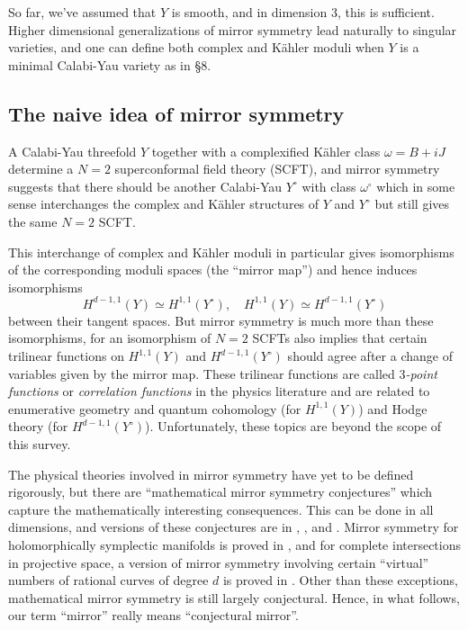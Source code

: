 \documentclass{amsart}
\theoremstyle{plain}
\theoremstyle{definition}
\begin{document}
	So far, we've assumed that $Y$ is smooth, and in dimension 3,
this is sufficient.  Higher dimensional generalizations of mirror
symmetry lead naturally to singular varieties, and one can define both
complex and K\"ahler moduli when $Y$ is a minimal Calabi-Yau variety
as in \S8.

	\subsection{The naive idea of mirror symmetry} A
Calabi-Yau threefold $Y$ together with a complexified K\"ahler class
$\omega = B + iJ$ determine a $N = 2$ superconformal field theory
(SCFT), and mirror symmetry suggests that there should be another
Calabi-Yau $Y^\circ$ with class $\omega^\circ$ which in some sense
interchanges the complex and K\"ahler structures of $Y$ and $Y^\circ$ but
still gives the same $N=2$ SCFT.

	This interchange of complex and K\"ahler moduli in particular
gives isomorphisms of the corresponding moduli spaces (the ``mirror
map'') and hence induces isomorphisms
\begin{equation}
H^{d-1,1}(Y) \simeq H^{1,1}(Y^\circ),\quad H^{1,1}(Y) \simeq
H^{d-1,1}(Y^\circ)
\tag{10.2}\label{eq:10.2}
\end{equation}
between their tangent spaces.  But mirror symmetry is much more than
these isomorphisms, for an isomorphism of $N=2$ SCFTs also implies
that certain trilinear functions on $H^{1,1}(Y)$ and
$H^{d-1,1}(Y^\circ)$ should agree after a change of variables given by
the mirror map.  These trilinear functions are called {\it $3$-point
functions\/} or {\it correlation functions\/} in the physics
literature and are related to enumerative geometry and quantum
cohomology (for $H^{1,1}(Y)$) and Hodge theory (for
$H^{d-1,1}(Y^\circ)$).  Unfortunately, these topics are beyond the
scope of this survey.

	The physical theories involved in mirror symmetry have yet to
be defined rigorously, but there are ``mathematical mirror symmetry
conjectures'' which capture the mathematically interesting
consequences.  This can be done in all dimensions, and versions of
these conjectures are in \cite{Mor1,Mor2,Mor3}, \cite{Giv2}, \cite{Kont} and
\cite{Ver}.  Mirror symmetry for holomorphically symplectic manifolds
is proved in \cite{Ver}, and for complete intersections in projective
space, a version of mirror symmetry involving certain ``virtual''
numbers of rational curves of degree $d$ is proved in \cite{Giv1}.
Other than these exceptions, mathematical mirror symmetry is still
largely conjectural.  Hence, in what follows, our term ``mirror''
really means ``conjectural mirror''.
\end{document}

